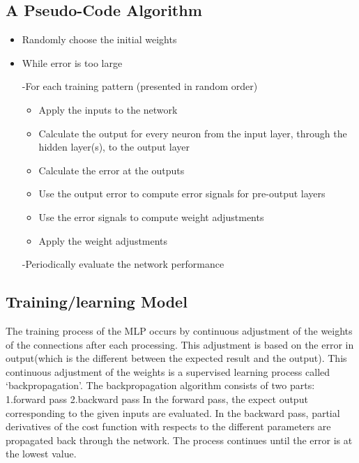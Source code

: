   \pagebreak
  \subsection{A Pseudo-Code Algorithm} 
\begin{itemize}
\item Randomly choose the initial weights
\item While error is too large \par
-For each training pattern (presented in random order)
\begin{itemize}
   
 \item Apply the inputs to the network
    \item Calculate the output for every neuron from the input layer, through the hidden layer(s), to the output layer
    \item Calculate the error at the outputs
    \item Use the output error to compute error signals for pre-output layers
    \item Use the error signals to compute weight adjustments
    \item Apply the weight adjustments \par

\end{itemize}
-Periodically evaluate the network performance 
\end{itemize}  
\subsection{Training/learning  Model}  
The training process of the MLP occurs by continuous adjustment of the weights of the connections after each processing. This adjustment is based on the error in output(which is the different between the expected result and the output). This continuous adjustment of the weights is a supervised learning process called ‘backpropagation’.\newline
The backpropagation algorithm consists of two parts:
\newline
1.forward pass\newline
2.backward pass\newline
In the forward pass, the expect output corresponding to the given inputs are evaluated.
In the backward pass, partial derivatives of the cost function with respects to the different parameters are propagated back through the network.\newline
The process continues until the error is at the lowest value.
\pagebreak
